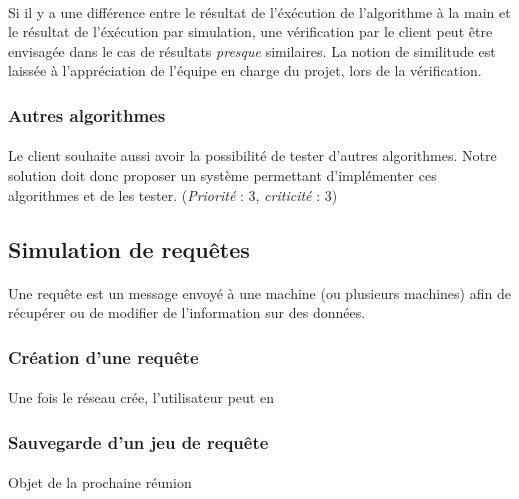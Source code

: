 \documentclass[12pt]{article}
\newcommand{\besoin}[2] {
  (\textit{Priorité} : #1, \textit{criticité} : #2)
}
\begin{document}
\paragraph{} Si il y a une différence entre le résultat de l'éxécution de l'algorithme à la main et le résultat de l'éxécution par simulation, une vérification par le client peut être envisagée dans le cas de résultats \textit{presque} similaires. 
La notion de similitude est laissée à l'appréciation de l'équipe en charge du projet, lors de la vérification.


\subsubsection{Autres algorithmes}

\paragraph{} Le client souhaite aussi avoir la possibilité de tester d'autres algorithmes. 
Notre solution doit donc proposer un système permettant d'implémenter ces algorithmes et de les tester. \besoin{3}{3} 


\subsection{Simulation de requêtes}

\paragraph{} Une requête est un message envoyé à une machine (ou plusieurs machines) afin de récupérer ou de modifier de l'information sur des données.


\subsubsection{Création d'une requête}

\paragraph{} Une fois le réseau crée, l'utilisateur peut en


\subsubsection{Sauvegarde d'un jeu de requête}

\paragraph{} Objet de la prochaine réunion
\end{document}
